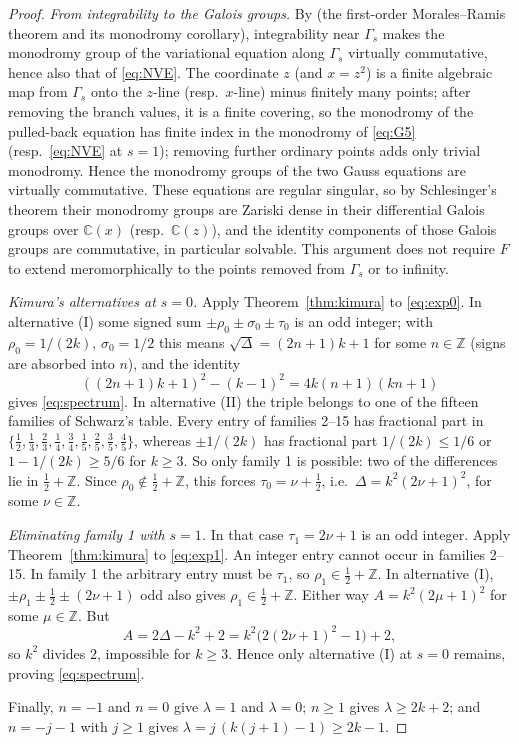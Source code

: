 \documentclass[11pt]{article}
\numberwithin{equation}{section}
\theoremstyle{definition}
\theoremstyle{remark}
\newcommand{\C}{\mathbb C}
\newcommand{\Z}{\mathbb Z}
\begin{document}
\begin{proof}
\emph{From integrability to the Galois groups.} By \cite[Sec.~1--2]{MRS07} (the first-order Morales--Ramis theorem
and its monodromy corollary), integrability near $\Gamma_s$ makes the monodromy group of the variational equation
along $\Gamma_s$ virtually commutative, hence also that of \eqref{eq:NVE}. The coordinate $z$ (and $x=z^2$) is a
finite algebraic map from $\Gamma_s$ onto the $z$-line (resp.\ $x$-line) minus finitely many points; after removing
the branch values, it is a finite covering, so the monodromy of the pulled-back equation has finite index in the
monodromy of \eqref{eq:G5} (resp.\ \eqref{eq:NVE} at $s=1$); removing further ordinary points adds only trivial
monodromy. Hence the monodromy groups of the two Gauss equations are virtually commutative. These equations are regular singular, so by Schlesinger's theorem their monodromy groups are Zariski dense in their differential Galois groups over $\C(x)$ (resp.\ $\C(z)$), and the identity components of those Galois groups are commutative, in
particular solvable. This argument does not require $F$ to extend meromorphically to the points removed from
$\Gamma_s$ or to infinity.

\emph{Kimura's alternatives at $s=0$.} Apply Theorem~\ref{thm:kimura} to \eqref{eq:exp0}. In alternative (I) some
signed sum $\pm\rho_0\pm\sigma_0\pm\tau_0$ is an odd integer; with $\rho_0=1/(2k)$, $\sigma_0=1/2$ this means
$\sqrt\Delta=(2n+1)k+1$ for some $n\in\Z$ (signs are absorbed into $n$), and the identity
\[
((2n+1)k+1)^2-(k-1)^2=4k(n+1)(kn+1)
\]
gives \eqref{eq:spectrum}. In alternative (II) the triple belongs to one of the fifteen families of Schwarz's table.
Every entry of families 2--15 has fractional part in $\{\tfrac12,\tfrac13,\tfrac23,\tfrac14,\tfrac34,\tfrac15,
\tfrac25,\tfrac35,\tfrac45\}$, whereas $\pm1/(2k)$ has fractional part $1/(2k)\le1/6$ or $1-1/(2k)\ge5/6$ for $k\ge3$.
So only family 1 is possible: two of the differences lie in $\tfrac12+\Z$. Since $\rho_0\notin\tfrac12+\Z$, this
forces $\tau_0=\nu+\tfrac12$, i.e.\ $\Delta=k^2(2\nu+1)^2$, for some $\nu\in\Z$.

\emph{Eliminating family 1 with $s=1$.} In that case $\tau_1=2\nu+1$ is an odd integer. Apply
Theorem~\ref{thm:kimura} to \eqref{eq:exp1}. An integer entry cannot occur in families 2--15. In family 1 the
arbitrary entry must be $\tau_1$, so $\rho_1\in\tfrac12+\Z$. In alternative (I), $\pm\rho_1\pm\tfrac12\pm(2\nu+1)$ odd
also gives $\rho_1\in\tfrac12+\Z$. Either way $A=k^2(2\mu+1)^2$ for some $\mu\in\Z$. But
\[
A=2\Delta-k^2+2=k^2\bigl(2(2\nu+1)^2-1\bigr)+2,
\]
so $k^2$ divides $2$, impossible for $k\ge3$. Hence only alternative (I) at $s=0$ remains, proving
\eqref{eq:spectrum}.

Finally, $n=-1$ and $n=0$ give $\lambda=1$ and $\lambda=0$; $n\ge1$ gives $\lambda\ge2k+2$; and $n=-j-1$ with $j\ge1$
gives $\lambda=j\,(k(j+1)-1)\ge2k-1$.
\end{proof}
\end{document}

